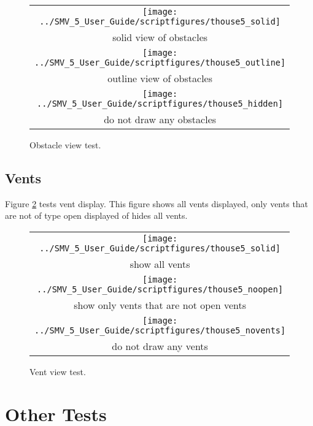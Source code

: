 \documentclass[11pt,twoside]{book}
\newcommand{\figoptions}{hbp}
\begin{document}
\begin{figure}[\figoptions]
\begin{center}
\begin{tabular}{c}
 \texttt{[image: ../SMV\_5\_User\_Guide/scriptfigures/thouse5\_solid]}\\
 solid view of obstacles\\
 \texttt{[image: ../SMV\_5\_User\_Guide/scriptfigures/thouse5\_outline]}\\
 outline view of obstacles\\
 \texttt{[image: ../SMV\_5\_User\_Guide/scriptfigures/thouse5\_hidden]}\\
 do not draw any obstacles\\

 \end{tabular}
\end{center}
 \caption{Obstacle view test.}
\label{figobsttest}%
\end{figure}

\section{Vents}
Figure \ref{figventtest} tests vent display.  This figure shows all vents displayed, only vents that are not of type open displayed of hides all vents.

\begin{figure}[\figoptions]
\begin{center}
\begin{tabular}{c}
 \texttt{[image: ../SMV\_5\_User\_Guide/scriptfigures/thouse5\_solid]}\\
 show all vents\\
 \texttt{[image: ../SMV\_5\_User\_Guide/scriptfigures/thouse5\_noopen]}\\
 show only vents that are not open vents\\
 \texttt{[image: ../SMV\_5\_User\_Guide/scriptfigures/thouse5\_novents]}\\
 do not draw any vents\\

 \end{tabular}
\end{center}
 \caption{Vent view test.}
\label{figventtest}%
\end{figure}

\chapter{Other Tests}
\end{document}
